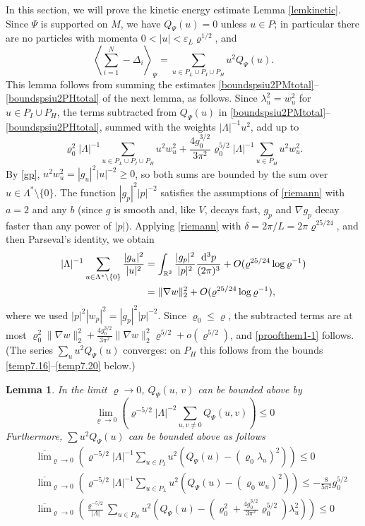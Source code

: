 \documentclass[11pt]{article}
\numberwithin{equation}{section}
\newcommand{\rd}{{\rm d}}
\newcommand{\beq}{\begin{equation}}
\newcommand{\eeq}{\end{equation}}
\newcommand{\beqa}{\begin{eqnarray}}
\newcommand{\eeqa}{\end{eqnarray}}
\newcommand\R{{\mathbb R}}
\newcommand\eps{\varepsilon}
\renewcommand\rho\varrho
\newtheorem{lem}{Lemma}[section]
\theoremstyle{definition}
\begin{document}
In this section, we will prove the kinetic energy estimate Lemma \ref{lemkinetic}.
Since $\Psi$ is supported on $M$, we have $Q_\Psi(u)=0$ unless $u\in P$; in particular there are no particles with momenta $0<|u|<\eps_L\rho^{1/2}$, and
\[
\left\langle\sum_{i=1}^N-\Delta_i\right\rangle_{\Psi}=\sum_{u\in P_L\cup P_I\cup P_H}u^2Q_\Psi(u) .
\]
This lemma follows from summing the estimates \eqref{boundspsiu2PMtotal}--\eqref{boundspsiu2PHtotal} of the next lemma, as follows. Since $\lambda_u^2=w_u^2$ for $u\in P_I\cup P_H$, the terms subtracted from $Q_\Psi(u)$ in \eqref{boundspsiu2PMtotal}--\eqref{boundspsiu2PHtotal}, summed with the weights $|\Lambda|^{-1}u^2$, add up to
\[
\rho_0^2|\Lambda|^{-1}\sum_{u\in P_L\cup P_I\cup P_H}u^2w_u^2+\frac{4g^{3/2}_0}{3\pi^2}\rho_0^{5/2}|\Lambda|^{-1}\sum_{u\in P_H}u^2w_u^2 .
\]
By \eqref{gp}, $u^2w_u^2=|g_u|^2|u|^{-2}\geq0$, so both sums are bounded by the sum over $u\in\Lambda^*\setminus\{0\}$. The function $|g_p|^2|p|^{-2}$ satisfies the assumptions of \eqref{riemann} with $a=2$ and any $b$ (since $g$ is smooth and, like $V$, decays fast, $g_p$ and $\nabla g_p$ decay faster than any power of $|p|$). Applying \eqref{riemann} with $\delta=2\pi/L=2\pi\rho^{25/24}$, and then Parseval's identity, we obtain
\begin{align*}
|\Lambda|^{-1}\sum_{u\in \Lambda^*\setminus\{0\}}\frac{|g_u|^2}{|u|^{2}}&=\int_{\R^3}\frac{|g_p|^2}{|p|^{2}}\frac{\rd^3p}{(2\pi)^3}+O(\rho^{25/24}\log\rho^{-1})\\
&=\|\nabla w\|_2^2+O(\rho^{25/24}\log\rho^{-1}),
\end{align*}
where we used $|p|^2|w_p|^2=|g_p|^2|p|^{-2}$. Since $\rho_0\leq\rho$, the subtracted terms are at most $\rho_0^2\|\nabla w\|_2^2+\frac{4g^{3/2}_0}{3\pi^2}\|\nabla w\|_2^2\rho^{5/2}+o(\rho^{5/2})$, and \eqref{proofthem1-1} follows. (The series $\sum_u u^2Q_\Psi(u)$ converges: on $P_H$ this follows from the bounds \eqref{temp7.16}--\eqref{temp7.20} below.)


\begin{lem}\label{boundspsiu} 
In the limit $\rho\to0$, $Q_\Psi(u,\,v)$ can be bounded  above by 
\beq\label{boundspsiuvtotal}
\lim_{\rho\to 0} \left(\rho^{-5/2}|\Lambda|^{-2}\sum_{u,v\neq 0} Q_\Psi(u,v)\right) \le 0
\eeq
Furthermore, $\sum u^2  Q_\Psi(u)$ can be bounded  above as follows
\beqa\label{boundspsiu2PMtotal}
&&\overline\lim_{\rho\to 0} \left(\rho^{-5/2}|\Lambda|^{-1}\sum_{u\in P_I}u^2\left( Q_\Psi(u)-(\rho_0\lambda_u
)^2   \right)\right)\le 0\\
\label{boundspsiu2PLtotal}
&&\overline\lim_{\rho\to 0} \left(\rho^{-5/2}|\Lambda|^{-1}\sum_{u\in P_L}u^2\left( Q_\Psi(u)-(\rho_0w_u)^2\right)\right)\leq-\frac{8}{5\pi^2}g_0^{5/2}\\
\label{boundspsiu2PHtotal}
&&\overline\lim_{\rho\to 0} \left(\frac{\rho^{-5/2}}{|\Lambda|}\!\!\sum_{u\in P_H}u^2\!\!\left( Q_\Psi(u)\!-\!\left(\rho_0^2+\frac{4g^{3/2}_0}{3\pi^2}\rho_0^{5/2}\right)\!\lambda^2_u   \!\right)\!\!\right) \le 0
\eeqa
\end{lem}
\end{document}
